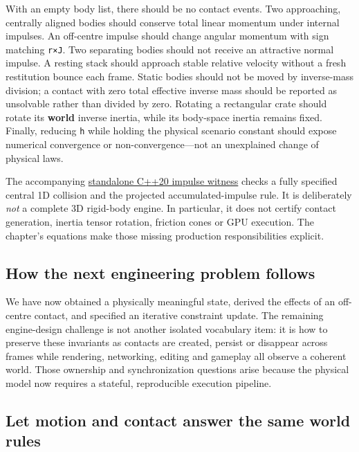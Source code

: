 With an empty body list, there should be no contact events. Two approaching, centrally aligned bodies should conserve total linear momentum under internal impulses. An off-centre impulse should change angular momentum with sign matching \texttt{r×J}. Two separating bodies should not receive an attractive normal impulse. A resting stack should approach stable relative velocity without a fresh restitution bounce each frame. Static bodies should not be moved by inverse-mass division; a contact with zero total effective inverse mass should be reported as unsolvable rather than divided by zero. Rotating a rectangular crate should rotate its \textbf{world} inverse inertia, while its body-space inertia remains fixed. Finally, reducing \texttt{h} while holding the physical scenario constant should expose numerical convergence or non-convergence---not an unexplained change of physical laws.

The accompanying \hyperref[source-file-128143bcbfc7213e97eaefa4]{standalone C++20 impulse witness} checks a fully specified central 1D collision and the projected accumulated-impulse rule. It is deliberately \emph{not} a complete 3D rigid-body engine. In particular, it does not certify contact generation, inertia tensor rotation, friction cones or GPU execution. The chapter's equations make those missing production responsibilities explicit.

\subsection{How the next engineering problem follows}\label{06-engine-ii-ch033-how-the-next-engineering-problem-follows}

We have now obtained a physically meaningful state, derived the effects of an off-centre contact, and specified an iterative constraint update. The remaining engine-design challenge is not another isolated vocabulary item: it is how to preserve these invariants as contacts are created, persist or disappear across frames while rendering, networking, editing and gameplay all observe a coherent world. Those ownership and synchronization questions arise because the physical model now requires a stateful, reproducible execution pipeline.

\subsection{Let motion and contact answer the same world rules}\label{06-engine-ii-ch033-let-motion-and-contact-answer-the-same-world-rules}


